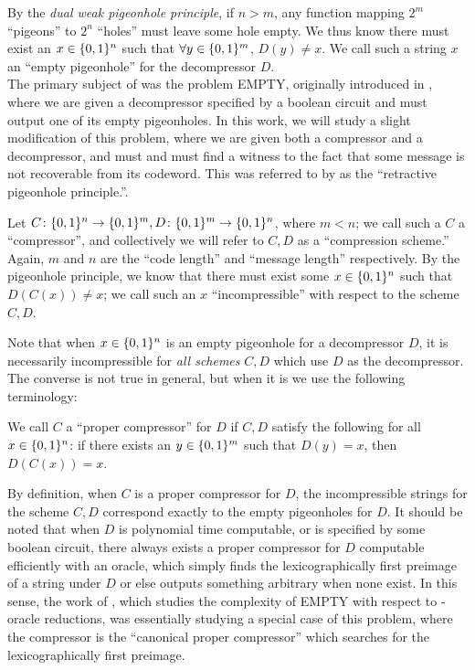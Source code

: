 By the \emph{dual weak pigeonhole principle}, if $n > m$, any function mapping $2^m$ ``pigeons'' to $2^n$ ``holes'' must leave some hole empty. We thus know there must exist an $x \in \{0,1\}^n$ such that $\forall y \in \{0,1\}^m$, $D(y) \neq x$. We call such a string $x$ an ``empty pigeonhole'' for the decompressor $D$.\\
The primary subject of \cite{Korten} was the problem {\sc EMPTY}, originally introduced in \cite{total}, where we are given a decompressor specified by a boolean circuit and must output one of its empty pigeonholes. In this work, we will study a slight modification of this problem, where we are given both a compressor and a decompressor, and must and must find a witness to the fact that some message is not recoverable from its codeword. This was referred to by \Jer as the ``retractive pigeonhole principle.''\cite{wph-classes}.

\begin{definition}
Let $C\colon\{0,1\}^n\rightarrow \{0,1\}^m, D\colon \{0,1\}^m \rightarrow \{0,1\}^n$, where $m< n$; we call such a $C$ a ``compressor'', and collectively we will refer to $C,D$ as a ``compression scheme.'' Again, $m$ and $n$ are the ``code length'' and ``message length'' respectively. By the pigeonhole principle, we know that there must exist some $x \in \{0,1\}^n$ such that $D(C(x)) \neq x$; we call such an $x$ ``incompressible'' with respect to the scheme $C,D$.
\end{definition}

Note that when $x \in \{0,1\}^n$ is an empty pigeonhole for a decompressor $D$, it is necessarily incompressible for \emph{all schemes} $C,D$ which use $D$ as the decompressor. The converse is not true in general, but when it is we use the following terminology:
\begin{definition}
We call $C$ a ``proper compressor'' for $D$ if $C,D$ satisfy the following for all $x \in \{0,1\}^n$: if there exists an $y \in \{0,1\}^m$ such that $D(y)=x$, then $D(C(x)) = x$. 
\end{definition}
By definition, when $C$ is a proper compressor for $D$, the incompressible strings for the scheme $C,D$ correspond exactly to the empty pigeonholes for $D$.  It should be noted that when $D$ is polynomial time computable, or is specified by some boolean circuit, there always exists a proper compressor for $D$ computable efficiently with an  oracle, which simply finds the lexicographically first preimage of a string under $D$ or else outputs something arbitrary when none exist. In this sense, the work of \cite{Korten}, which studies the complexity of {\sc EMPTY} with respect to -oracle reductions, was essentially studying a special case of this problem, where the compressor is the ``canonical proper compressor'' which searches for the lexicographically first preimage.

